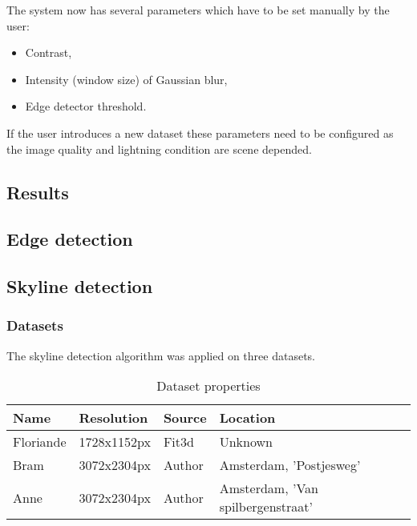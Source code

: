 The system now has several parameters which have to be set manually by the user:
\begin{itemize}
	\item Contrast,
	\item Intensity (window size) of Gaussian blur,
	\item Edge detector threshold.
\end{itemize}

If the user introduces a new dataset these parameters need to be configured
as the image quality and lightning condition are scene depended.


\subsection{Results}
\subsection{Edge detection}
\label{sec:ResultEdge}
\clearpage
{}
\clearpage


\subsection{Skyline detection}
\subsubsection{Datasets}
The skyline detection algorithm was applied on three datasets. 

\begin{table}[ht]
\caption{Dataset properties}
\begin{tabular}{|l||l|l|l|}
\hline
Name 	& Resolution 	& Source	& Location\\
\hline
\hline
Floriande & 1728x1152px  & Fit3d \cite{Fit3d}  	& Unknown\\
\hline
Bram	 & 3072x2304px  & Author					& Amsterdam, 'Postjesweg'\\
\hline
Anne	& 3072x2304px  & Author					& Amsterdam, 'Van spilbergenstraat'\\
\hline
\end{tabular}
\end{table}


